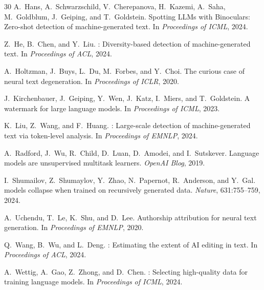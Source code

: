 \documentclass[11pt,a4paper]{article}
\begin{document}
\begin{thebibliography}{30}
A.~Hans, A.~Schwarzschild, V.~Cherepanova, H.~Kazemi, A.~Saha, M.~Goldblum,
  J.~Geiping, and T.~Goldstein.
\newblock Spotting {LLMs} with {Binoculars}: Zero-shot detection of machine-generated text.
\newblock In \emph{Proceedings of ICML}, 2024.

Z.~He, B.~Chen, and Y.~Liu.
: Diversity-based detection of machine-generated text.
\newblock In \emph{Proceedings of ACL}, 2024.

A.~Holtzman, J.~Buys, L.~Du, M.~Forbes, and Y.~Choi.
\newblock The curious case of neural text degeneration.
\newblock In \emph{Proceedings of ICLR}, 2020.

J.~Kirchenbauer, J.~Geiping, Y.~Wen, J.~Katz, I.~Miers, and T.~Goldstein.
\newblock A watermark for large language models.
\newblock In \emph{Proceedings of ICML}, 2023.

K.~Liu, Z.~Wang, and F.~Huang.
: Large-scale detection of machine-generated text via token-level analysis.
\newblock In \emph{Proceedings of EMNLP}, 2024.

A.~Radford, J.~Wu, R.~Child, D.~Luan, D.~Amodei, and I.~Sutskever.
\newblock Language models are unsupervised multitask learners.
\newblock \emph{OpenAI Blog}, 2019.

I.~Shumailov, Z.~Shumaylov, Y.~Zhao, N.~Papernot, R.~Anderson, and
  Y.~Gal.
 models collapse when trained on recursively generated data.
\newblock \emph{Nature}, 631:755--759, 2024.

A.~Uchendu, T.~Le, K.~Shu, and D.~Lee.
\newblock Authorship attribution for neural text generation.
\newblock In \emph{Proceedings of EMNLP}, 2020.

Q.~Wang, B.~Wu, and L.~Deng.
: Estimating the extent of {AI} editing in text.
\newblock In \emph{Proceedings of ACL}, 2024.

A.~Wettig, A.~Gao, Z.~Zhong, and D.~Chen.
: Selecting high-quality data for training language models.
\newblock In \emph{Proceedings of ICML}, 2024.


\end{thebibliography}
\end{document}
